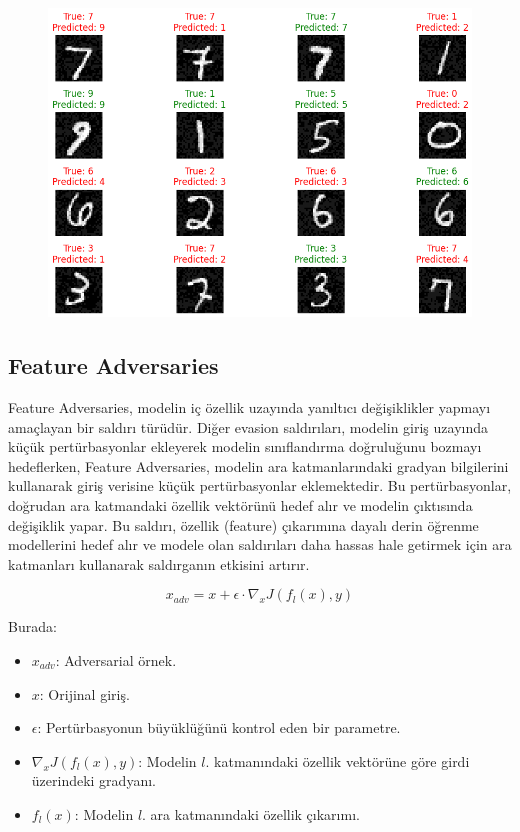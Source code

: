 \begin{figure}[h]
    \centering
    \includegraphics[width=1\textwidth]{images/fgm_attack_results.png}
    \caption{}
\end{figure}

\newpage

\subsection{Feature Adversaries}

Feature Adversaries, modelin iç özellik uzayında yanıltıcı değişiklikler yapmayı amaçlayan bir saldırı türüdür. Diğer evasion saldırıları, modelin giriş uzayında küçük pertürbasyonlar ekleyerek modelin sınıflandırma doğruluğunu bozmayı hedeflerken, Feature Adversaries, modelin ara katmanlarındaki gradyan bilgilerini kullanarak giriş verisine küçük pertürbasyonlar eklemektedir. Bu pertürbasyonlar, doğrudan ara katmandaki özellik vektörünü hedef alır ve modelin çıktısında değişiklik yapar. Bu saldırı, özellik (feature) çıkarımına dayalı derin öğrenme modellerini hedef alır ve modele olan saldırıları daha hassas hale getirmek için ara katmanları kullanarak saldırganın etkisini artırır.

\[ x_{adv} = x + \epsilon \cdot \nabla_x J(f_l(x), y) \]

Burada:

\begin{itemize}
    \item $x_{adv}$: Adversarial örnek.
    \item $x$: Orijinal giriş.
    \item $\epsilon$: Pertürbasyonun büyüklüğünü kontrol eden bir parametre.
    \item $\nabla_x J(f_l(x), y)$: Modelin $l$. katmanındaki özellik vektörüne göre girdi üzerindeki gradyanı.
    \item $f_l(x)$: Modelin $l$. ara katmanındaki özellik çıkarımı.
\end{itemize}

